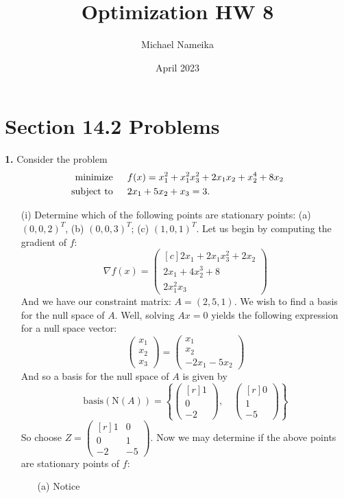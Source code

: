 \documentclass{article}
\title{Optimization HW 8}
\author{Michael Nameika}
\date{April 2023}
\begin{document}
\maketitle

\section*{Section 14.2 Problems}
\textbf{1.} Consider the problem
\begin{align*}
    \text{minimize} \hspace{1.5em} &f(x) = x_1^2 + x_1^2x_3^2 + 2x_1x_2 + x_2^4 + 8x_2\\
    \text{subject to} \hspace{1.5em} &2x_1 + 5x_2 + x_3 = 3.
\end{align*}
\begin{itemize}
    \item[(i)] Determine which of the following points are stationary points: (a) $(0,0,2)^T$, (b) $(0,0,3)^T$; (c) $(1,0,1)^T$.
    \newline\newline
    Let us begin by computing the gradient of $f$:
    \[\nabla f(x) = \begin{pmatrix*}[c]
        2x_1 + 2x_1x_3^2 + 2x_2\\
        2x_1 + 4x_2^3 + 8\\
        2x_1^2x_3
    \end{pmatrix*}\]
    And we have our constraint matrix: $A = (2, 5, 1)$. We wish to find a basis for the null space of $A$. Well, solving $Ax = 0$ yields the following expression for a null space vector:
    \[\begin{pmatrix}
        x_1\\
        x_2\\
        x_3
    \end{pmatrix}
    = 
    \begin{pmatrix}
        x_1\\
        x_2\\
        -2x_1 - 5x_2
    \end{pmatrix}\]
    And so a basis for the null space of $A$ is given by
    \[\text{basis}(\text{N}(A)) = \left\{ \begin{pmatrix*}[r]
        1\\
        0\\
        -2
    \end{pmatrix*}, \hspace{1em}
    \begin{pmatrix*}[r]
        0\\
        1\\
        -5
    \end{pmatrix*}\right\}\]
    So choose $Z = \begin{pmatrix*}[r] 1 & 0\\ 0 & 1\\ -2 & -5\end{pmatrix*}$. Now we may determine if the above points are stationary points of $f$:
    \begin{itemize}
        \item[(a)] Notice
        

\end{itemize}
\end{itemize}
\end{document}
